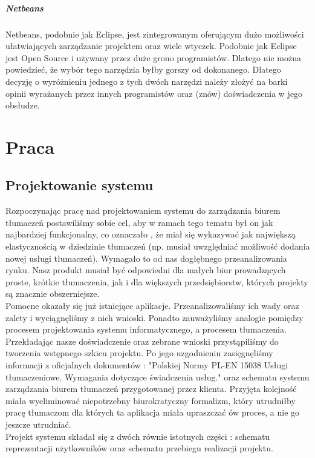 \documentclass[licencjacka]{pracamgr}
\begin{document}
\paragraph{Netbeans}
Netbeans, podobnie jak Eclipse, jest zintegrowanym oferującym dużo możliwości ułatwiających zarządzanie projektem oraz wiele wtyczek. Podobnie jak Eclipse jest Open Source i używany przez duże grono programistów. Dlatego nie można powiedzieć, że wybór tego narzędzia byłby gorszy od dokonanego. Dlatego decyzję o wyróżnieniu jednego z tych dwóch narzędzi należy złożyć na barki opinii wyrażanych przez innych programistów oraz (znów) doświadczenia w jego obsłudze.


\chapter{Praca}
\section{Projektowanie systemu}
Rozpoczynając pracę nad projektowaniem systemu do zarządzania biurem tłumaczeń postawiliśmy sobie cel, aby w ramach tego tematu był on jak najbardziej funkcjonalny,
co oznaczało , że miał się wykazywać jak największą elastycznością w dziedzinie tłumaczeń (np. musiał uwzględniać możliwość dodania nowej usługi tłumaczeń). 
Wymagało to od nas dogłębnego przeanalizowania rynku. Nasz produkt musiał być odpowiedni dla małych biur prowadzących proste, krótkie tłumaczenia, jak i dla większych 
przedsiębiorstw, których projekty są znacznie obszerniejsze.\\

Pomocne okazały się już istniejące aplikacje. Przeanalizowaliśmy ich wady oraz zalety i wyciągnęliśmy z nich wnioski. Ponadto zauważyliśmy analogie pomiędzy procesem projektowania
systemu informatycznego, a procesem tłumaczenia. Przekładając nasze doświadczenie oraz zebrane wnioski przystąpiliśmy do tworzenia wstępnego szkicu projektu. 
Po jego uzgodnieniu zasięgnęliśmy informacji z oficjalnych dokumentów : "Polskiej Normy PL-EN 15038 Usługi tłumaczeniowe. Wymagania dotyczące świadczenia usług." oraz
schematu systemu zarządzania biurem tłumaczeń przygotowanej przez klienta.
Przyjęta kolejność miała wyeliminować niepotrzebny biurokratyczny formalizm, który utrudniłby pracę tłumaczom dla których ta aplikacja miała upraszczać ów proces, a nie go jeszcze utrudniać.\\

Projekt systemu składał się z dwóch równie istotnych części : schematu reprezentacji użytkowników oraz schematu przebiegu realizacji projektu.\\
\end{document}
